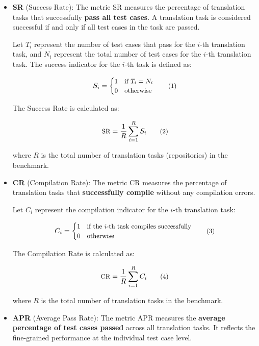 \begin{itemize}[left=10pt]
    \item \textbf{SR} (Success Rate): The metric SR measures the percentage of translation tasks that successfully \textbf{pass all test cases}. A translation task is considered successful if and only if all test cases in the task are passed.
    
    Let $T_i$ represent the number of test cases that pass for the $i$-th translation task, and $N_i$ represent the total number of test cases for the $i$-th translation task. The success indicator for the $i$-th task is defined as:
    
    \[
    \small
    S_i = \begin{cases}
    1 & \text{if } T_i = N_i \\
    0 & \text{otherwise}
    \end{cases}
    \tag{1}
    \]
    
    The Success Rate is calculated as:
    
    \[
    \small
    \text{SR} = \frac{1}{R} \sum_{i=1}^{R} S_i
    \tag{2}
    \]
    
    where $R$ is the total number of translation tasks (repositories) in the benchmark.

    \item \textbf{CR} (Compilation Rate): The metric CR measures the percentage of translation tasks that \textbf{successfully compile} without any compilation errors.
    
    Let $C_i$ represent the compilation indicator for the $i$-th translation task:
    
    \[
    \small
    C_i = \begin{cases}
    1 & \text{if the } i\text{-th task compiles successfully} \\
    0 & \text{otherwise}
    \end{cases}
    \tag{3}
    \]
    
    The Compilation Rate is calculated as:
    
    \[
    \small
    \text{CR} = \frac{1}{R} \sum_{i=1}^{R} C_i
    \tag{4}
    \]
    
    where $R$ is the total number of translation tasks in the benchmark.

    \item \textbf{APR} (Average Pass Rate): The metric APR measures the \textbf{average percentage of test cases passed} across all translation tasks. It reflects the fine-grained performance at the individual test case level.


\end{itemize}
